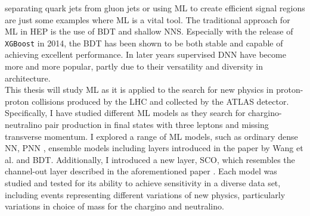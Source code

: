 separating quark jets from gluon jets \cite{PhysRevD.44.2025} or using \ac{ML} to create efficient signal regions \cite{baldi_searching_2014} are 
just some examples where \ac{ML} is a vital tool. The traditional approach for \ac{ML} in \ac{HEP} is the use of \acf{BDT} and shallow \acf{NNS}. 
Especially with the release of \verb!XGBoost! \cite{XGB} in 2014, the \ac{BDT} has been shown to be both stable and capable of achieving excellent 
performance. In later years supervised \acf{DNN} have become more and more popular, partly due to their versatility and diversity in architecture.
\newline
\\
This thesis will study \ac{ML} as it is applied to the search for new physics in proton-proton collisions produced by the \ac{LHC} and collected by 
the \acs{ATLAS} detector. Specifically, I have studied different \ac{ML} models as they search for chargino-neutralino pair production in final states 
with three leptons and missing transverse momentum. I explored a range of \ac{ML} models, such as ordinary dense \acs{NN}, \acf{PNN} \cite{PNN},
ensemble models including layers introduced in the paper by Wang et al. \cite{wang_maxout_2013} and \acl{BDT}. Additionally, I introduced a new layer, \acl{SCO}, which 
resembles the channel-out layer described in the aforementioned paper \cite{wang_maxout_2013}. Each model was studied and tested for its ability to achieve sensitivity
in a diverse data set, including events representing different variations of new physics, particularly variations in choice of mass for the chargino and neutralino.
\newpage
